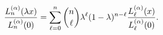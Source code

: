 \[\frac{\mathop{L^{(\alpha)}_{n}\/}\nolimits\!\left(\lambda x\right)}{\mathop{L^%
{(\alpha)}_{n}\/}\nolimits\!\left(0\right)}=\sum_{\ell=0}^{n}\binom{n}{\ell}%
\lambda^{\ell}(1-\lambda)^{n-\ell}\frac{\mathop{L^{(\alpha)}_{\ell}\/}%
\nolimits\!\left(x\right)}{\mathop{L^{(\alpha)}_{\ell}\/}\nolimits\!\left(0%
\right)}.\]